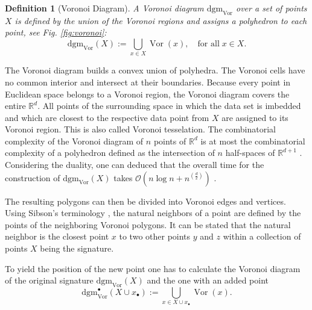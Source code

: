 \documentclass[journal]{IEEEtran}
\DeclareMathOperator{\Vor}{Vor}
\newtheorem{definition}{Definition}[section]
\begin{document}


\begin{definition}[Voronoi Diagram]
\label{def:voronoi}
A Voronoi diagram $\text{dgm}_{\Vor}$ over a set of points $X$ is defined by the union of the Voronoi regions and assigns a polyhedron to each point, see Fig. \ref{fig:voronoi}:
\begin{equation}
\text{dgm}_{\Vor}(X) := \bigcup_{x \in X} \Vor(x), \quad \text{for all} \; x \in X.
\end{equation}
\end{definition}

The Voronoi diagram builds a convex union of polyhedra. The Voronoi cells have no common interior and intersect at their boundaries. Because every point in Euclidean space belongs to a Voronoi region, the Voronoi diagram covers the entire $\mathbb{R}^d$. All points of the surrounding space in which the data set is imbedded and which are closest to the respective data point from $X$ are assigned to its Voronoi region. This is also called Voronoi tesselation.
The combinatorial complexity of the Voronoi diagram of $n$ points of $\mathbb{R}^d$ is at most the combinatorial complexity of a polyhedron defined as the intersection of $n$ half-spaces of $\mathbb{R}^{d+1}$  \cite{BoissonnatDG18}. Considering the duality, one can deduced that the overall time for the construction of $\text{dgm}_{\Vor}(X)$ takes $\mathcal{O}( n \log n+n^{(\frac{d}{2})})$  \cite{BoissonnatDG18}.

The resulting polygons can then be divided into Voronoi edges and vertices. Using Sibson's terminology \cite{Sibson}, the natural neighbors of a point are defined by the points of the neighboring Voronoi polygons. It can be stated that the natural neighbor is the closest point $x$ to two other points $y$ and $z$ within a collection of points $X$ being the signature.

To yield the position of the new point one has to calculate the Voronoi diagram of the original signature $\text{dgm}_{\Vor}(X)$ and the one with an added point
\begin{equation}
\text{dgm}_{\Vor}^{\bullet}(X\cup x_{\bullet}) := \bigcup_{x \in X \cup x_\bullet} \Vor(x).
\end{equation}
\end{document}
